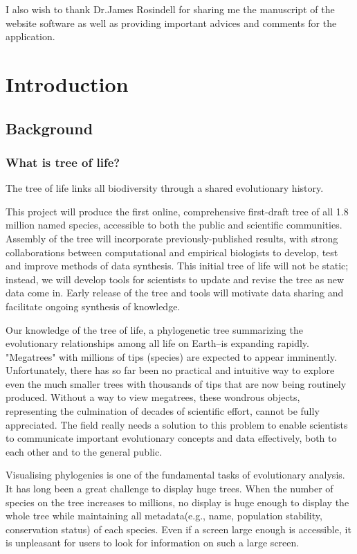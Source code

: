\documentclass[MSc]{icldt}
\begin{document}
I also wish to thank Dr.James Rosindell for sharing me the manuscript of the website software as well as providing important advices and comments for the application.


\makededication

\tableofcontents
\listoftables
\listoffigures

\chapter{Introduction}

\section{Background}

\subsection{What is tree of life?}
The tree of life links all biodiversity through a shared evolutionary history. \cite{emotiv}

This project will produce the first online, comprehensive first-draft tree of all 1.8 million named species, accessible to both the public and scientific communities. Assembly of the tree will incorporate previously-published results, with strong collaborations between computational and empirical biologists to develop, test and improve methods of data synthesis. This initial tree of life will not be static; instead, we will develop tools for scientists to update and revise the tree as new data come in. Early release of the tree and tools will motivate data sharing and facilitate ongoing synthesis of knowledge.

Our knowledge of the tree of life, a phylogenetic tree summarizing the evolutionary relationships among all life on Earth--is expanding rapidly. "Megatrees" with millions of tips (species) are expected to appear imminently. Unfortunately, there has so far been no practical and intuitive way to explore even the much smaller trees with thousands of tips that are now being routinely produced. Without a way to view megatrees, these wondrous objects, representing the culmination of decades of scientific effort, cannot be fully appreciated. The field really needs a solution to this problem to enable scientists to communicate important evolutionary concepts and data effectively, both to each other and to the general public.


Visualising phylogenies is one of the fundamental tasks of evolutionary analysis. It has long been a great challenge to display huge trees. When the number of species on the tree increases to millions, no display is huge enough to display the whole tree while maintaining all metadata(e.g., name, population stability, conservation status) of each species. Even if a screen large enough is accessible, it is unpleasant for users to look for information on such a large screen. 
\end{document}
